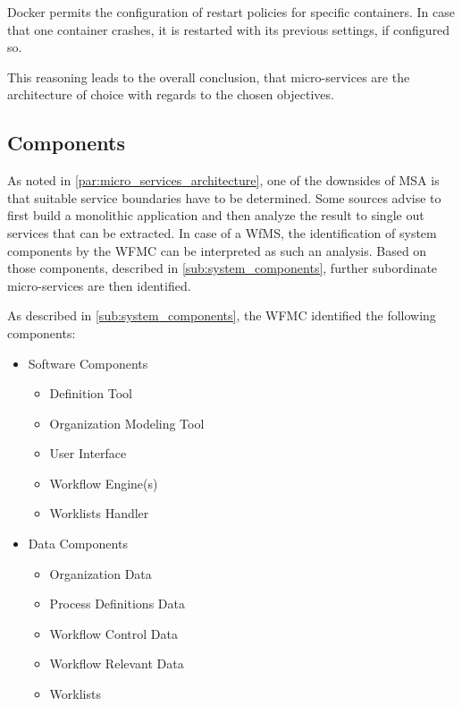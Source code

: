     Docker permits the configuration of restart policies for specific containers. In case that one container crashes, it is restarted with its previous settings, if configured so.

    This reasoning leads to the overall conclusion, that micro-services are the architecture of choice with regards to the chosen objectives.


\subsection{Components} %
\label{sub:components}
  As noted in \ref{par:micro_services_architecture}, one of the downsides of \ac{MSA} is that suitable service boundaries have to be determined. Some sources advise to first build a monolithic application and then analyze the result to single out services that can be extracted. In case of a \ac{WfMS}, the identification of system components by the \ac{WFMC} can be interpreted as such an analysis. Based on those components, described in \ref{sub:system_components}, further subordinate micro-services are then identified.

  As described in \ref{sub:system_components}, the \ac{WFMC} identified the following components:
    \begin{itemize}[nosep]
      \item Software Components
        \begin{itemize}[nosep]
          \item Definition Tool
          \item Organization Modeling Tool
          \item User Interface
          \item Workflow Engine(s)
          \item Worklists Handler
        \end{itemize}
      \item Data Components
        \begin{itemize}[nosep]
          \item Organization Data
          \item Process Definitions Data
          \item Workflow Control Data
          \item Workflow Relevant Data
          \item Worklists
        \end{itemize}
    \end{itemize}

